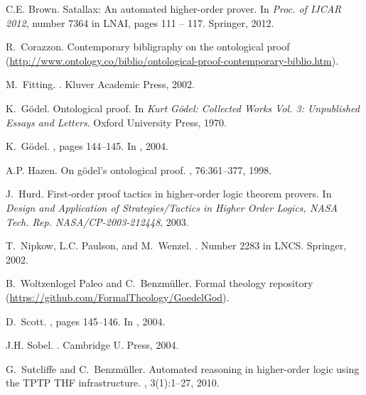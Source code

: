 \documentclass{llncs}
\begin{document}
\begin{thebibliography}{10}
C.E. Brown.
\newblock Satallax: An automated higher-order prover.
\newblock In {\em Proc. of IJCAR 2012}, number 7364 in LNAI, pages 111 -- 117.
  Springer, 2012.

R.~Corazzon.
\newblock Contemporary bibligraphy on the ontological proof
  (\url{http://www.ontology.co/biblio/ontological-proof-contemporary-biblio.htm}).

M.~Fitting.
.
\newblock Kluver Academic Press, 2002.

K.~G\"odel.
\newblock Ontological proof.
\newblock In {\em {Kurt G\"odel: Collected Works Vol. 3: Unpublished Essays and
  Letters}}. Oxford University Press, 1970.

K.~G\"odel.
, pages 144--145.
\newblock In  \cite{sobel2004logic}, 2004.

A.P. Hazen.
\newblock On g\"odel's ontological proof.
, 76:361--377, 1998.

J.~Hurd.
\newblock First-order proof tactics in higher-order logic theorem provers.
\newblock In {\em Design and Application of Strategies/Tactics in Higher Order
  Logics, NASA Tech. Rep. NASA/CP-2003-212448}, 2003.

T.~Nipkow, L.C. Paulson, and M.~Wenzel.
.
\newblock Number 2283 in LNCS. Springer, 2002.

B.~Woltzenlogel Paleo and C.~Benzm\"uller.
\newblock Formal theology repository
  (\url{https://github.com/FormalTheology/GoedelGod}).

D.~Scott.
, pages 145--146.
\newblock In  \cite{sobel2004logic}, 2004.

J.H. Sobel.
.
\newblock Cambridge U. Press, 2004.

G.~Sutcliffe and C.~Benzm{\"u}ller.
\newblock Automated reasoning in higher-order logic using the {TPTP THF}
  infrastructure.
, 3(1):1--27, 2010.

\end{thebibliography}
\end{document}
